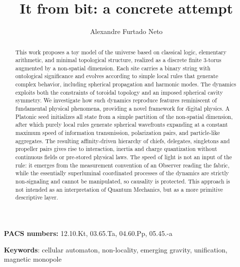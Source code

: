 \documentclass{ijuc}
\begin{document}
\title{It from bit: a concrete attempt}

\author{Alexandre Furtado Neto
}


\def\received{\today}

\maketitle

\begin{abstract}
\sloppy
This work proposes a toy model of the universe based on classical logic, elementary arithmetic, and minimal topological structure, realized as a discrete finite 3-torus augmented by a non-spatial dimension. Each site carries a binary string with ontological significance and evolves according to simple local rules that generate complex behavior, including spherical propagation and harmonic modes. The dynamics exploits both the constraints of toroidal topology and an imposed spherical cavity symmetry. We investigate how such dynamics reproduce features reminiscent of fundamental physical phenomena, providing a novel framework for digital physics. A Platonic seed initializes all state from a simple partition of the non-spatial dimension, after which purely local rules generate spherical wavefronts expanding at a constant maximum speed of information transmission, polarization pairs, and particle-like aggregates. The resulting affinity-driven hierarchy of chiefs, delegates, singletons and propeller pairs gives rise to interaction, inertia and charge quantization without continuous fields or pre-stored physical laws. The speed of light is not an input of the rule: it emerges from the measurement convention of an Observer reading the fabric, while the essentially superluminal coordinated processes of the dynamics are strictly non-signaling and cannot be manipulated, so causality is protected. This approach is not intended as an interpretation of Quantum Mechanics, but as a more primitive descriptive layer.

\medskip{}
\end{abstract}

\vfill

\begin{center}
\textbf{PACS numbers: }12.10.Kt, 03.65.Ta, 04.60.Pp, 05.45.-a
\par\end{center}

\begin{center}
\textbf{Keywords}: cellular automaton, non-locality, emerging gravity, unification, magnetic monopole
\par\end{center}
\end{document}
